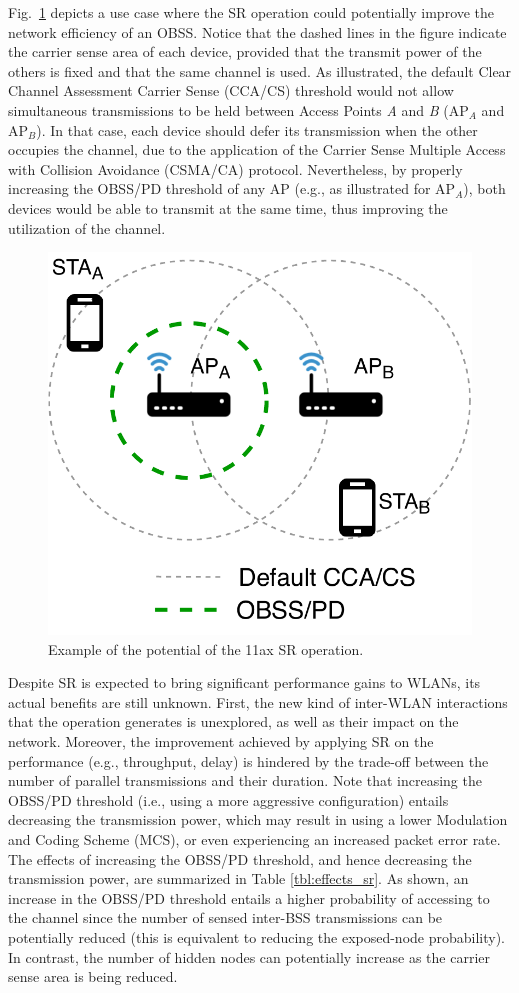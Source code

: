 \documentclass[conference]{IEEEtran}
\begin{document}
	Fig.~\ref{fig:example_sr} depicts a use case where the SR operation could potentially improve the network efficiency of an OBSS. Notice that the dashed lines in the figure indicate the carrier sense area of each device, provided that the transmit power of the others is fixed and that the same channel is used. As illustrated, the default Clear Channel Assessment Carrier Sense (CCA/CS) threshold would not allow simultaneous transmissions to be held between Access Points \textit{A} and \textit{B} (AP$_A$ and AP$_B$). In that case, each device should defer its transmission when the other occupies the channel, due to the application of the Carrier Sense Multiple Access with Collision Avoidance (CSMA/CA) protocol. Nevertheless, by properly increasing the OBSS/PD threshold of any AP (e.g., as illustrated for AP$_A$), both devices would be able to transmit at the same time, thus improving the utilization of the channel.
	\begin{figure}[ht!]
		\centering
		\includegraphics[width=0.6\columnwidth]{fig_1}
		\caption{Example of the potential of the 11ax SR operation.}
		\label{fig:example_sr}
	\end{figure}
	
	Despite SR is expected to bring significant performance gains to WLANs, its actual benefits are still unknown. First, the new kind of inter-WLAN interactions that the operation generates is unexplored, as well as their impact on the network. Moreover, the improvement achieved by applying SR on the performance (e.g., throughput, delay) is hindered by the trade-off between the number of parallel transmissions and their duration. Note that increasing the OBSS/PD threshold (i.e., using a more aggressive configuration) entails decreasing the transmission power, which may result in using a lower Modulation and Coding Scheme (MCS), or even experiencing an increased packet error rate. The effects of increasing the OBSS/PD threshold, and hence decreasing the transmission power, are summarized in Table \ref{tbl:effects_sr}. As shown, an increase in the OBSS/PD threshold entails a higher probability of accessing to the channel since the number of sensed inter-BSS transmissions can be potentially reduced (this is equivalent to reducing the exposed-node probability). In contrast, the number of hidden nodes can potentially increase as the carrier sense area is being reduced.
	
\end{document}
